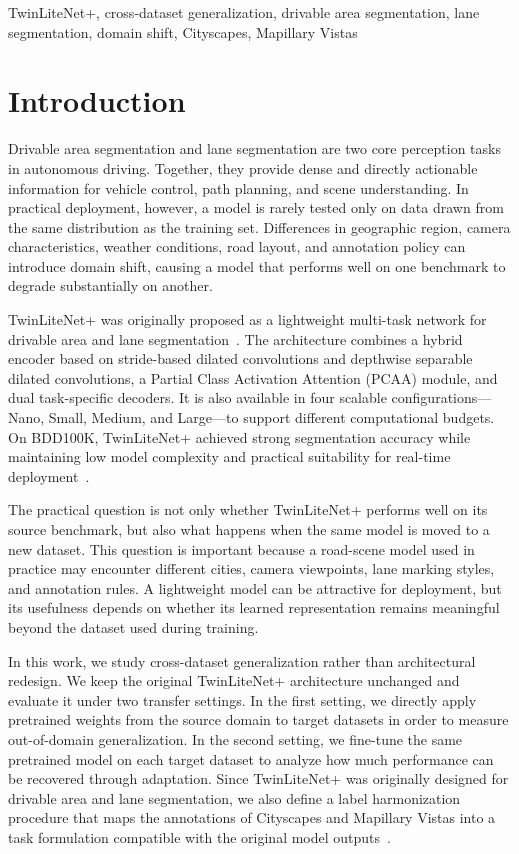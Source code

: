 \documentclass[conference]{IEEEtran}
\begin{document}
\begin{IEEEkeywords}
  TwinLiteNet+, cross-dataset generalization, drivable area segmentation, lane segmentation, domain shift, Cityscapes, Mapillary Vistas
\end{IEEEkeywords}

\section{Introduction}
Drivable area segmentation and lane segmentation are two core perception tasks in autonomous driving. Together, they provide dense and directly actionable information for vehicle control, path planning, and scene understanding. In practical deployment, however, a model is rarely tested only on data drawn from the same distribution as the training set. Differences in geographic region, camera characteristics, weather conditions, road layout, and annotation policy can introduce domain shift, causing a model that performs well on one benchmark to degrade substantially on another.

TwinLiteNet+ was originally proposed as a lightweight multi-task network for drivable area and lane segmentation~\cite{ref1}. The architecture combines a hybrid encoder based on stride-based dilated convolutions and depthwise separable dilated convolutions, a Partial Class Activation Attention (PCAA) module, and dual task-specific decoders. It is also available in four scalable configurations---Nano, Small, Medium, and Large---to support different computational budgets. On BDD100K, TwinLiteNet+ achieved strong segmentation accuracy while maintaining low model complexity and practical suitability for real-time deployment~\cite{ref1,ref2}.

The practical question is not only whether TwinLiteNet+ performs well on its source benchmark, but also what happens when the same model is moved to a new dataset. This question is important because a road-scene model used in practice may encounter different cities, camera viewpoints, lane marking styles, and annotation rules. A lightweight model can be attractive for deployment, but its usefulness depends on whether its learned representation remains meaningful beyond the dataset used during training.

In this work, we study cross-dataset generalization rather than architectural redesign. We keep the original TwinLiteNet+ architecture unchanged and evaluate it under two transfer settings. In the first setting, we directly apply pretrained weights from the source domain to target datasets in order to measure out-of-domain generalization. In the second setting, we fine-tune the same pretrained model on each target dataset to analyze how much performance can be recovered through adaptation. Since TwinLiteNet+ was originally designed for drivable area and lane segmentation, we also define a label harmonization procedure that maps the annotations of Cityscapes and Mapillary Vistas into a task formulation compatible with the original model outputs~\cite{ref3,ref4}.
\end{document}
